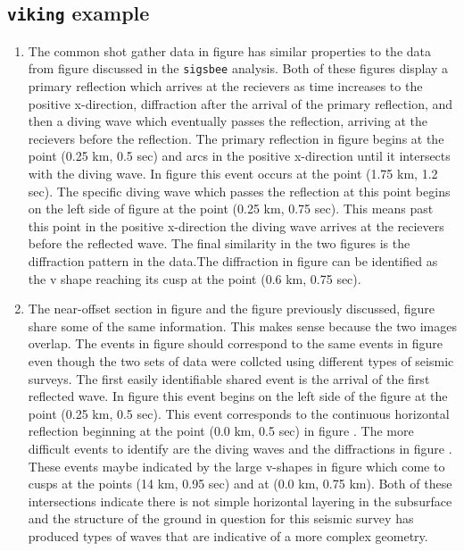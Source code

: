 \subsection{\texttt{viking} example}
\begin{enumerate}
\item The common shot gather data in figure  has similar properties to the data from figure  discussed in the \texttt{sigsbee} analysis. Both of these figures display a primary reflection which arrives at the recievers as time increases to the positive x-direction, diffraction after the arrival of the primary reflection, and then a diving wave which eventually passes the reflection, arriving at the recievers before the reflection. The primary reflection in figure  begins at the point (0.25 km, 0.5 sec) and arcs in the positive x-direction until it intersects with the diving wave. In figure  this event occurs at the point (1.75 km, 1.2 sec). The specific diving wave which passes the reflection at this point begins on the left side of figure  at the point (0.25 km, 0.75 sec). This means past this point in the positive x-direction the diving wave arrives at the recievers before the reflected wave. The final similarity in the two figures is the diffraction pattern in the data.The diffraction in figure  can be identified as the v shape reaching its cusp at the point (0.6 km, 0.75 sec).
\item The near-offset section in figure  and the figure previously discussed, figure  share some of the same information. This makes sense because the two images overlap. The events in figure  should correspond to the same events in figure  even though the two sets of data were collcted using different types of seismic surveys. The first easily identifiable shared event is the arrival of the first reflected wave. In figure  this event begins on the left side of the figure at the point (0.25 km, 0.5 sec). This event corresponds to the continuous horizontal reflection beginning at the point (0.0 km, 0.5 sec) in figure . The more difficult events to identify are the diving waves and the diffractions in figure . These events maybe indicated by the large v-shapes in figure  which come to cusps at the points (14 km, 0.95 sec) and at (0.0 km, 0.75 km). Both of these intersections indicate there is not simple horizontal layering in the subsurface and the structure of the ground in question for this seismic survey has produced types of waves that are indicative of a more complex geometry.
\end{enumerate}


